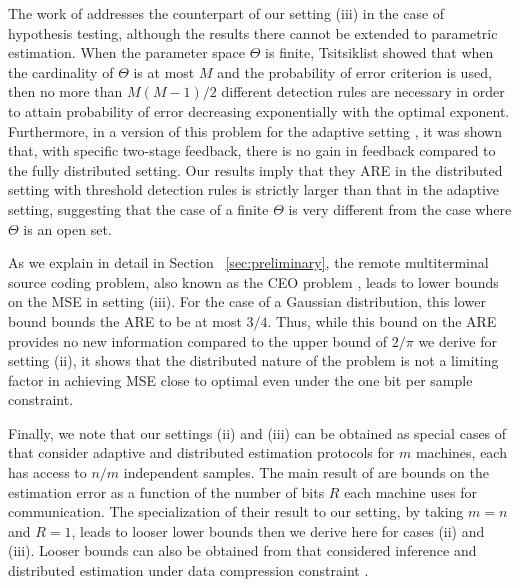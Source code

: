 \documentclass[letterpaper, 11pt]{IEEEtran}      %
\begin{document}
The work of \cite{52470} addresses the counterpart of our setting (iii) in the case of hypothesis testing, although the results there cannot be extended to parametric estimation. When the parameter space $\Theta$ is finite, Tsitsiklist \cite{tsitsiklis1988decentralized} showed that when the cardinality of $\Theta$ is at most $M$ and the probability of error criterion is used, then no more than $M(M-1)/2$ different detection rules are necessary in order to attain probability of error decreasing exponentially with the optimal exponent. %
Furthermore, in a version of this problem for the adaptive setting \cite{5751320}, it was shown that, with specific two-stage feedback, there is no gain in feedback compared to the fully distributed setting. Our results imply that they ARE in the distributed setting with threshold detection rules is strictly larger than that in the adaptive setting, suggesting that the case of a finite $\Theta$ is very different from the case where $\Theta$ is an open set.\par
%
As we explain in detail in Section~ \ref{sec:preliminary}, the remote multiterminal source coding problem, also known as the CEO problem \cite{berger1996ceo, viswanathan1997quadratic, oohama1998rate, prabhakaran2004rate}, leads to lower bounds on the MSE in setting (iii). For the case of a Gaussian distribution, this lower bound bounds the ARE to be at most $3/4$. Thus, while this bound on the ARE provides no new information compared to the upper bound of $2/\pi$ we derive for setting (ii), it shows that the distributed nature of the problem is not a limiting factor in achieving MSE close to optimal even under the one bit per sample constraint. 
 \par
% 
Finally, we note that our settings (ii) and (iii) can be obtained as special cases of 
\cite{zhang2013information} 
that consider adaptive and distributed estimation protocols for $m$ machines, each has access to $n/m$ independent samples. The main result of \cite{zhang2013information} are bounds on the estimation error as a function of the number of bits $R$ each machine uses for communication. The specialization of their result to our setting, by taking $m=n$ and $R=1$, leads to looser lower bounds then we derive here for cases (ii) and (iii). Looser bounds can also be obtained from \cite{zhang1988estimation, han2018distributed, } that considered inference and distributed estimation under data compression constraint \cite{DBLP:journals/corr/abs-1802-08417, zhang1988estimation, han2018distributed, xu2017information}. \\
\end{document}

